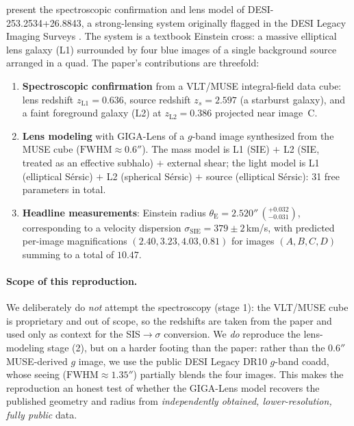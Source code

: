 \documentclass[11pt,letterpaper]{article}
\newcommand{\thetaE}{\ensuremath{\theta_{\mathrm{E}}}}
\newcommand{\sigmaSIE}{\ensuremath{\sigma_{\mathrm{SIE}}}}
\renewcommand{\arcsec}{\ensuremath{''}}
\begin{document}
\citet{cikota2023einstein} present the spectroscopic confirmation and
lens model of DESI-253.2534+26.8843, a strong-lensing system originally
flagged in the DESI Legacy Imaging Surveys
\autocite{huang2021discovery,dey2019legacy}. The system is a textbook
Einstein cross: a massive elliptical lens galaxy (L1) surrounded by four
blue images of a single background source arranged in a quad. The paper's
contributions are threefold:
\begin{enumerate}
\item \textbf{Spectroscopic confirmation} from a VLT/MUSE
      \autocite{bacon2010muse} integral-field data cube: lens redshift
      $z_{\mathrm{L1}} = 0.636$, source redshift $z_s = 2.597$ (a
      starburst galaxy), and a faint foreground galaxy (L2) at
      $z_{\mathrm{L2}} = 0.386$ projected near image~C.
\item \textbf{Lens modeling} with GIGA-Lens \autocite{gu2022gigalens}
      of a $g$-band image synthesized from the MUSE cube
      ($\mathrm{FWHM}\approx0.6\arcsec$). The mass model is L1 (SIE)
      $+$ L2 (SIE, treated as an effective subhalo) $+$ external shear;
      the light model is L1 (elliptical S\'ersic) $+$ L2 (spherical
      S\'ersic) $+$ source (elliptical S\'ersic): 31 free parameters in
      total.
\item \textbf{Headline measurements}: Einstein radius
      $\thetaE = 2.520\arcsec\,(^{+0.032}_{-0.031})$, corresponding to a
      velocity dispersion $\sigmaSIE = 379\pm2\,$km/s, with predicted
      per-image magnifications $(2.40, 3.23, 4.03, 0.81)$ for images
      $(A,B,C,D)$ summing to a total of $10.47$.
\end{enumerate}

\paragraph{Scope of this reproduction.} We deliberately do \emph{not}
attempt the spectroscopy (stage 1): the VLT/MUSE cube is proprietary and
out of scope, so the redshifts are taken from the paper and used only as
context for the SIS$\to\sigma$ conversion. We \emph{do} reproduce the
lens-modeling stage (2), but on a harder footing than the paper: rather
than the $0.6\arcsec$ MUSE-derived $g$ image, we use the public DESI
Legacy DR10 $g$-band coadd, whose seeing ($\mathrm{FWHM}\approx1.35\arcsec$)
partially blends the four images. This makes the reproduction an honest
test of whether the GIGA-Lens model recovers the published geometry and
radius from \emph{independently obtained, lower-resolution, fully public}
data.
\end{document}
